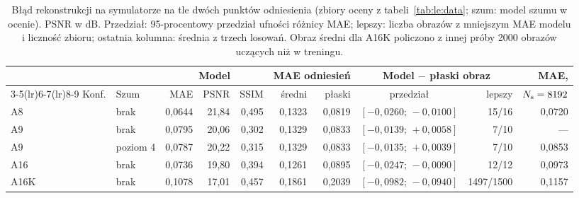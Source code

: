 \begin{table}[tb]
\centering
\caption[Błąd rekonstrukcji na symulatorze na tle dwóch punktów odniesienia]{Błąd rekonstrukcji na symulatorze na tle dwóch punktów odniesienia (zbiory oceny z tabeli~\ref{tab:le:data}; szum: model szumu w ocenie). PSNR w dB. Przedział: 95-procentowy przedział ufności różnicy MAE; lepszy: liczba obrazów z mniejszym MAE modelu i liczność zbioru; ostatnia kolumna: średnia z trzech losowań. Obraz średni dla A16K policzono z innej próby 2000 obrazów uczących niż w treningu.}
\label{tab:le:sim}
\footnotesize
\setlength{\tabcolsep}{4pt}
\begin{tabular}{@{}llrrrrrcrr@{}}
\toprule
 & & \multicolumn{3}{c}{Model} & \multicolumn{2}{c}{MAE odniesień} & \multicolumn{2}{c}{Model $-$ płaski obraz} & MAE, \\
\cmidrule(lr){3-5}\cmidrule(lr){6-7}\cmidrule(lr){8-9}
Konf. & Szum & MAE & PSNR & SSIM & średni & płaski & przedział & lepszy & $N_{\mathrm{s}}=8192$ \\
\midrule
A8 & brak & 0,0644 & 21,84 & 0,495 & 0,1323 & 0,0819 & $[-0{,}0260;\,-0{,}0100]$ & 15/16 & 0,0720 \\
A9 & brak & 0,0795 & 20,06 & 0,302 & 0,1329 & 0,0833 & $[-0{,}0139;\,+0{,}0058]$ & 7/10 & --- \\
A9 & poziom 4 & 0,0787 & 20,22 & 0,315 & 0,1329 & 0,0833 & $[-0{,}0135;\,+0{,}0039]$ & 7/10 & 0,0853 \\
A16 & brak & 0,0736 & 19,80 & 0,394 & 0,1261 & 0,0895 & $[-0{,}0247;\,-0{,}0090]$ & 12/12 & 0,0973 \\
A16K & brak & 0,1078 & 17,01 & 0,457 & 0,1861 & 0,2039 & $[-0{,}0982;\,-0{,}0940]$ & 1497/1500 & 0,1157 \\
\bottomrule
\end{tabular}
\end{table}

